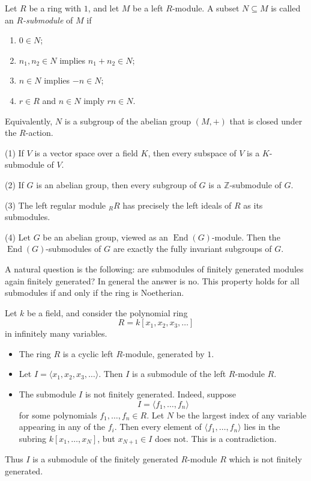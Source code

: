 \begin{definition}[$R$-submodule]
    Let $R$ be a ring with $1$, and let $M$ be a left $R$-module. A subset $N \subseteq M$ is called an \emph{$R$-submodule} of $M$ if
    \begin{enumerate}
        \item $0 \in N$;
        \item $n_1, n_2 \in N$ implies $n_1+n_2 \in N$;
        \item $n \in N$ implies $-n \in N$;
        \item $r \in R$ and $n \in N$ imply $rn \in N$.
    \end{enumerate}
    Equivalently, $N$ is a subgroup of the abelian group $(M,+)$ that is closed under the $R$-action.
\end{definition}

\begin{example}
    (1) If $V$ is a vector space over a field $K$, then every subspace of $V$ is a $K$-submodule of $V$.

    (2) If $G$ is an abelian group, then every subgroup of $G$ is a $\mathbb{Z}$-submodule of $G$.

    (3) The left regular module ${}_R R$ has precisely the left ideals of $R$ as its submodules.

    (4) Let $G$ be an abelian group, viewed as an $\operatorname{End}(G)$-module. Then the $\operatorname{End}(G)$-submodules of $G$ are exactly the fully invariant subgroups of $G$.
\end{example}

\begin{remark}
    A natural question is the following: are submodules of finitely generated modules again finitely generated? In general the answer is no. This property holds for all submodules if and only if the ring is Noetherian.
\end{remark}

\begin{example}
    Let $k$ be a field, and consider the polynomial ring
    \[
        R = k[x_1, x_2, x_3, \dots]
    \]
    in infinitely many variables.
    \begin{itemize}
        \item The ring $R$ is a cyclic left $R$-module, generated by $1$.
        \item Let $I = \langle x_1, x_2, x_3, \dots \rangle$. Then $I$ is a submodule of the left $R$-module $R$.
        \item The submodule $I$ is not finitely generated. Indeed, suppose
              \[
                  I = \langle f_1, \dots, f_n \rangle
              \]
              for some polynomials $f_1, \dots, f_n \in R$. Let $N$ be the largest index of any variable appearing in any of the $f_i$. Then every element of $\langle f_1, \dots, f_n \rangle$ lies in the subring $k[x_1, \dots, x_N]$, but $x_{N+1} \in I$ does not. This is a contradiction.
    \end{itemize}
    Thus $I$ is a submodule of the finitely generated $R$-module $R$ which is not finitely generated.
\end{example}

